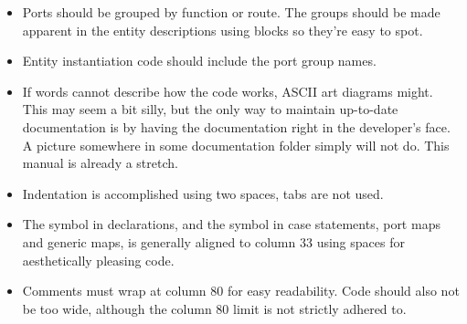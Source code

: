 \begin{itemize}
\item Ports should be grouped by function or route. The groups should be made
apparent in the entity descriptions using blocks so they're easy to spot.

\item Entity instantiation code should include the port group names.

\item If words cannot describe how the code works, ASCII art diagrams might. 
This may seem a bit silly, but the only way to maintain up-to-date documentation 
is by having the documentation right in the developer's face. A picture 
somewhere in some documentation folder simply will not do. This manual is 
already a stretch.
\item Indentation is accomplished using two spaces, tabs are not used.

\item The \code{:} symbol in declarations, and the \code{=>} symbol in case
statements, port maps and generic maps, is generally aligned to column 33 using
spaces for aesthetically pleasing code.

\item Comments must wrap at column 80 for easy readability. Code should also not 
be too wide, although the column 80 limit is not strictly adhered to.

\end{itemize}


